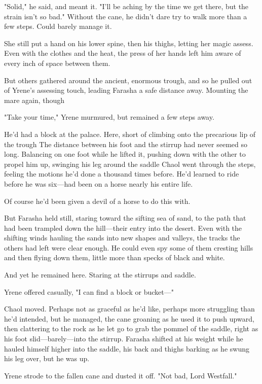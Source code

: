 "Solid," he said, and meant it. "I'll be aching by the time we get there, but the strain isn't so bad." Without the cane, he didn't dare try to walk more than a few steps. Could barely manage it.

She still put a hand on his lower spine, then his thighs, letting her magic assess. Even with the clothes and the heat, the press of her hands left him aware of every inch of space between them.

But others gathered around the ancient, enormous trough, and so he pulled out of Yrene's assessing touch, leading Farasha a safe distance away. Mounting the mare again, though 

"Take your time," Yrene murmured, but remained a few steps away.

He'd had a block at the palace. Here, short of climbing onto the precarious lip of the trough  The distance between his foot and the stirrup had never seemed so long. Balancing on one foot while he lifted it, pushing down with the other to propel him up, swinging his leg around the saddle  Chaol went through the steps, feeling the motions he'd done a thousand times before. He'd learned to ride before he was six---had been on a horse nearly his entire life.

Of course he'd been given a devil of a horse to do this with.

But Farasha held still, staring toward the sifting sea of sand, to the path that had been trampled down the hill---their entry into the desert. Even with the shifting winds hauling the sands into new shapes and valleys, the tracks the others had left were clear enough. He could even spy some of them cresting hills and then flying down them, little more than specks of black and white.

And yet he remained here. Staring at the stirrups and saddle.

Yrene offered casually, "I can find a block or bucket---"

Chaol moved. Perhaps not as graceful as he'd like, perhaps more struggling than he'd intended, but he managed, the cane groaning as he used it to push upward, then clattering to the rock as he let go to grab the pommel of the saddle, right as his foot slid---barely---into the stirrup. Farasha shifted at his weight while he hauled himself higher into the saddle, his back and thighs barking as he swung his leg over, but he was up.

Yrene strode to the fallen cane and dusted it off. "Not bad, Lord Westfall."

